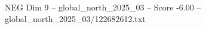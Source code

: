 \begin{textsample}{NEG Dim 9 – global\_north\_2025\_03 – Score -6.00 – global\_north\_2025\_03/122682612.txt}
\end{textsample}
